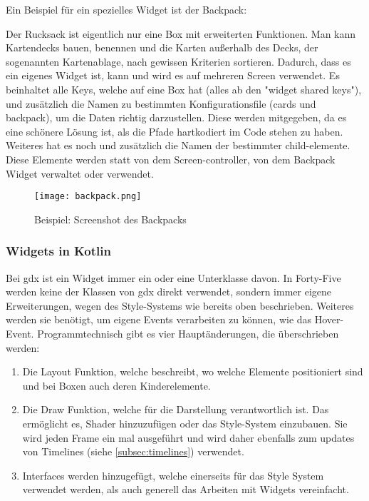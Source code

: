 Ein Beispiel für ein spezielles Widget ist der Backpack:
Der Rucksack ist eigentlich nur eine Box mit erweiterten Funktionen.
Man kann Kartendecks bauen, benennen und die Karten außerhalb des Decks, der sogenannten Kartenablage, nach gewissen Kriterien sortieren.
Dadurch, dass es ein eigenes Widget ist, kann und wird es auf mehreren Screen verwendet.
Es beinhaltet alle Keys, welche auf eine Box hat (alles ab den "widget shared keys"), und zusätzlich die Namen zu bestimmten Konfigurationsfile (cards und backpack), um die Daten richtig darzustellen.
Diese werden mitgegeben, da es eine schönere Lösung ist, als die Pfade hartkodiert im Code stehen zu haben.
Weiteres hat es noch und zusätzlich die Namen der bestimmter child-elemente.
Diese Elemente werden statt von dem Screen-controller, von dem Backpack Widget verwaltet oder verwendet.
\begin{figure}[H]
    \centering
    \texttt{[image: backpack.png]}
    \caption{Beispiel: Screenshot des Backpacks}
\end{figure}
\renewcommand{\kapitelautor}{Autor: Felix Zwickelstorfer}
\subsubsection{Widgets in Kotlin}\label{subsubsec:widgetsinkotlin}
\renewcommand{\kapitelautor}{Autor: Felix Zwickelstorfer}
Bei gdx ist ein Widget immer ein  oder eine Unterklasse davon.
In Forty-Five werden keine der Klassen von gdx direkt verwendet, sondern immer eigene Erweiterungen, wegen des Style-Systems wie bereits oben beschrieben.
Weiteres werden sie benötigt, um eigene Events verarbeiten zu können, wie das Hover-Event.
Programmtechnisch gibt es vier Hauptänderungen, die überschrieben werden:
\begin{enumerate}
    \item Die Layout Funktion, welche beschreibt, wo welche Elemente positioniert sind und bei Boxen auch deren Kinderelemente.
    \item Die Draw Funktion, welche für die Darstellung verantwortlich ist. Das ermöglicht es, Shader hinzuzufügen oder das Style-System einzubauen.
        Sie wird jeden Frame ein mal ausgeführt und wird daher ebenfalls zum updates von Timelines (siehe \ref{subsec:timelines}) verwendet.
    \item Interfaces werden hinzugefügt, welche einerseits für das Style System verwendet werden, als auch generell das Arbeiten mit Widgets vereinfacht.
\end{enumerate}
\renewcommand{\kapitelautor}{Autor: Felix Zwickelstorfer}
